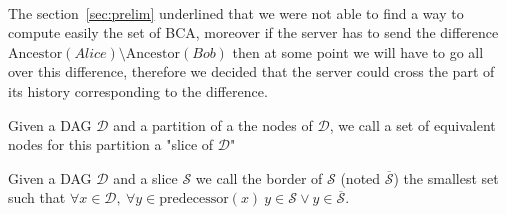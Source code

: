 \paragraph{} The section~\ref{sec:prelim} underlined that we were not able to find a way to compute easily the set of BCA, moreover if the server has to send the difference $\mathrm{Ancestor}(Alice) \setminus \mathrm{Ancestor}(Bob)$ then at some point we will have to go all over this difference, therefore we decided that the server could cross the part of its history corresponding to the difference.
\begin{definition}
 Given a DAG $\mathcal{D}$ and a partition of a the nodes of $\mathcal{D}$, we call a set of equivalent nodes for this partition a "slice of $\mathcal{D}$"
\end{definition}
\begin{definition}
 Given a DAG $\mathcal{D}$ and a slice $\mathcal{S}$ we call the border of $\mathcal{S}$ (noted $\overline{\mathcal S}$) the smallest set such that $\forall x \in \mathcal{D},\ \forall y\in \mathrm{predecessor}(x)\  y\in \mathcal{S} \vee y \in \overline{\mathcal S}$.
\end{definition}
